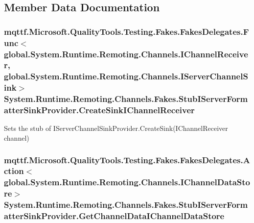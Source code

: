 \subsection{Member Data Documentation}
\hypertarget{class_system_1_1_runtime_1_1_remoting_1_1_channels_1_1_fakes_1_1_stub_i_server_formatter_sink_provider_ad92ef6ee03f59349cb2236f17ba65ec9}{
\subsubsection[{Create\-Sink\-I\-Channel\-Receiver}]{\setlength{\rightskip}{0pt plus 5cm}mqttf.\-Microsoft.\-Quality\-Tools.\-Testing.\-Fakes.\-Fakes\-Delegates.\-Func$<$global.\-System.\-Runtime.\-Remoting.\-Channels.\-I\-Channel\-Receiver, global.\-System.\-Runtime.\-Remoting.\-Channels.\-I\-Server\-Channel\-Sink$>$ System.\-Runtime.\-Remoting.\-Channels.\-Fakes.\-Stub\-I\-Server\-Formatter\-Sink\-Provider.\-Create\-Sink\-I\-Channel\-Receiver}}\label{class_system_1_1_runtime_1_1_remoting_1_1_channels_1_1_fakes_1_1_stub_i_server_formatter_sink_provider_ad92ef6ee03f59349cb2236f17ba65ec9}


Sets the stub of I\-Server\-Channel\-Sink\-Provider.\-Create\-Sink(\-I\-Channel\-Receiver channel)

\hypertarget{class_system_1_1_runtime_1_1_remoting_1_1_channels_1_1_fakes_1_1_stub_i_server_formatter_sink_provider_a19d81bbf00aab628cb20cdb0e9ee1770}{
\subsubsection[{Get\-Channel\-Data\-I\-Channel\-Data\-Store}]{\setlength{\rightskip}{0pt plus 5cm}mqttf.\-Microsoft.\-Quality\-Tools.\-Testing.\-Fakes.\-Fakes\-Delegates.\-Action$<$global.\-System.\-Runtime.\-Remoting.\-Channels.\-I\-Channel\-Data\-Store$>$ System.\-Runtime.\-Remoting.\-Channels.\-Fakes.\-Stub\-I\-Server\-Formatter\-Sink\-Provider.\-Get\-Channel\-Data\-I\-Channel\-Data\-Store}}\label{class_system_1_1_runtime_1_1_remoting_1_1_channels_1_1_fakes_1_1_stub_i_server_formatter_sink_provider_a19d81bbf00aab628cb20cdb0e9ee1770}


